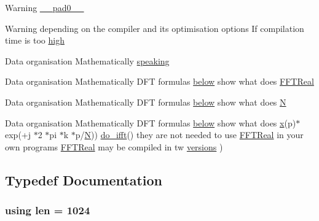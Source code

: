 \begin{DoxyCompactItemize}
\item 
Warning \hyperlink{FFTReal__readme_8txt_a18c0aa5889d7cc9c9c4e4ac7474f1dc7}{\+\_\+\+\_\+pad0\+\_\+\+\_\+}
\item 
Warning depending on the compiler and its optimisation options If compilation time is too \hyperlink{FFTReal__readme_8txt_af1a4dd6a27c987e5516ef3295e3e51f0}{high}
\item 
Data organisation Mathematically \hyperlink{FFTReal__readme_8txt_a2c9b06685d7b48b69727762751de915d}{speaking}
\item 
Data organisation Mathematically D\+FT formulas \hyperlink{FFTReal__readme_8txt_aadd6d22385a49baac7311a220729ab52}{below} show what does \hyperlink{FFTReal__readme_8txt_afc545541c7ab0be25cf239418fc47b65}{F\+F\+T\+Real}
\item 
Data organisation Mathematically D\+FT formulas \hyperlink{FFTReal__readme_8txt_aadd6d22385a49baac7311a220729ab52}{below} show what does \hyperlink{FFTReal__readme_8txt_a049dd452c22185832440207517cffdaa}{N}
\item 
Data organisation Mathematically D\+FT formulas \hyperlink{FFTReal__readme_8txt_aadd6d22385a49baac7311a220729ab52}{below} show what does \hyperlink{FFTReal__readme_8txt_a9c92ac89d1560f812393ca39a19e581e}{x}(p)$\ast$exp(+j $\ast$2 $\ast$pi $\ast$k $\ast$p/\hyperlink{FFTReal__readme_8txt_a049dd452c22185832440207517cffdaa}{N})) \hyperlink{FFTReal__readme_8txt_a1a33a3b7245f269d5150c436da7d5ed6}{do\+\_\+ifft}() they are not needed to use \hyperlink{FFTReal__readme_8txt_afc545541c7ab0be25cf239418fc47b65}{F\+F\+T\+Real} in your own programs \hyperlink{FFTReal__readme_8txt_afc545541c7ab0be25cf239418fc47b65}{F\+F\+T\+Real} may be compiled in tw \hyperlink{FFTReal__readme_8txt_a4c3ae4ba9b2751ae5f224f21fdfbb46d}{versions} )
\end{DoxyCompactItemize}


\subsection{Typedef Documentation}
\subsubsection[{\texorpdfstring{len}{len}}]{\setlength{\rightskip}{0pt plus 5cm}using {\bf len} =  1024}\hypertarget{FFTReal__readme_8txt_a555609f588a3dd8483e643133ba24b82}{}\label{FFTReal__readme_8txt_a555609f588a3dd8483e643133ba24b82}


